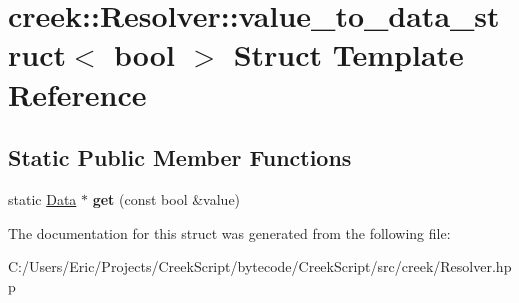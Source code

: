 \hypertarget{structcreek_1_1_resolver_1_1value__to__data__struct_3_01bool_01_4}{}\section{creek\+:\+:Resolver\+:\+:value\+\_\+to\+\_\+data\+\_\+struct$<$ bool $>$ Struct Template Reference}
\label{structcreek_1_1_resolver_1_1value__to__data__struct_3_01bool_01_4}
\subsection*{Static Public Member Functions}
\begin{DoxyCompactItemize}
\item 
static \hyperlink{classcreek_1_1_data}{Data} $\ast$ {\bfseries get} (const bool \&value)\hypertarget{structcreek_1_1_resolver_1_1value__to__data__struct_3_01bool_01_4_a5c8f9d0b568ab5e73923497d0be50467}{}\label{structcreek_1_1_resolver_1_1value__to__data__struct_3_01bool_01_4_a5c8f9d0b568ab5e73923497d0be50467}

\end{DoxyCompactItemize}


The documentation for this struct was generated from the following file\+:\begin{DoxyCompactItemize}
\item 
C\+:/\+Users/\+Eric/\+Projects/\+Creek\+Script/bytecode/\+Creek\+Script/src/creek/Resolver.\+hpp\end{DoxyCompactItemize}
